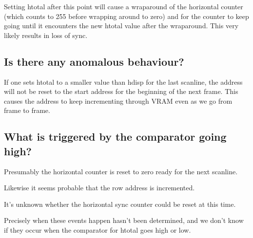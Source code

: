 \documentclass[a4paper,10pt]{amsart}
\begin{document}
Setting htotal after this point will cause a wraparound of the horizontal
counter (which counts to 255 before wrapping around to zero) and for the
counter to keep going until it encounters the new htotal value after the
wraparound. This very likely results in loss of sync.

\subsection{Is there any anomalous behaviour?}

If one sets htotal to a smaller value than hdisp for the last scanline, the
address will not be reset to the start address for the beginning of the next
frame. This causes the address to keep incrementing through VRAM even
as we go from frame to frame.

\subsection{What is triggered by the comparator going high?}

Presumably the horizontal counter is reset to zero ready for the next scanline.

Likewise it seems probable that the row address is incremented.

It's unknown whether the horizontal sync counter could be reset at this time.

Precisely when these events happen hasn't been determined, and we don't know
if they occur when the comparator for htotal goes high or low.
\end{document}

